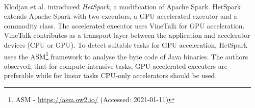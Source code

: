 \paragraph{}
Klodjan et al. \cite{Klodjan2018HetSpark} introduced \textit{HetSpark}, a modification of Apache Spark.
HetSpark extends Apache Spark with two executors, a GPU accelerated executor and a commodity class. 
The accelerated executor uses VineTalk\cite{Mavridis2017VineTalk} for GPU acceleration.
VineTalk contributes as a transport layer between the application and accelerator devices (CPU or GPU).
To detect suitable tasks for GPU acceleration, HetSpark uses the ASM\footnote{ASM - \url{https://asm.ow2.io/} (Accessed: 2021-01-11)} framework to analyse the byte code of Java binaries.
The authors observed, that for compute intensive tasks, GPU accelerated executers are preferable while for linear tasks CPU-only accelerators should be used.


